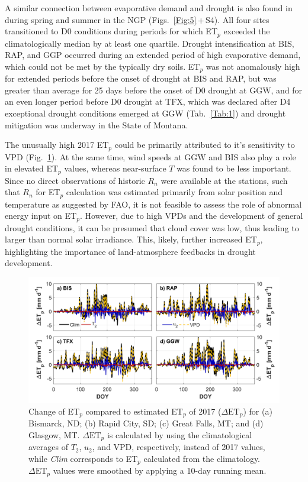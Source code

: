 \documentclass[hess, manuscript]{copernicus}
\begin{document}
A similar connection between evaporative demand and drought is also found in during spring and summer in the NGP (Figs.~\ref{Fig:5}\,+\,S4). All four sites transitioned to D0 conditions during periods for which ET$_p$ exceeded the climatologically median by at least one quartile. Drought intensification at BIS, RAP, and GGP occurred during an extended period of high evaporative demand, which could not be met by the typically dry soils. ET$_p$ was not anomalously high for extended periods before the onset of drought at BIS and RAP, but was greater than average for 25 days before the onset of D0 drought at GGW, and for an even longer period before D0 drought at TFX, which was declared after D4 exceptional drought conditions emerged at GGW (Tab.~\ref{Tab:1}) and drought mitigation was underway in the State of Montana.

The unusually high 2017 ET$_p$ could be primarily attributed to it's sensitivity to VPD (Fig.~\ref{Fig:6}). At the same time, wind speeds at GGW and BIS also play a role in elevated ET$_p$ values, whereas near-surface $T$ was found to be less important. Since no direct observations of historic $R_n$ were available at the stations, such that $R_n$ for ET$_p$ calculation was estimated primarily from solar position and temperature as suggested by FAO, it is not feasible to assess the role of abnormal energy input on ET$_p$. However, due to high VPDs and the development of general drought conditions, it can be presumed that cloud cover was low, thus leading to larger than normal solar irradiance. This, likely, further increased ET$_p$, highlighting the importance of land-atmosphere feedbacks in drought development.    

%
\begin{figure}[t]
\includegraphics[width=12cm]{./Figures/Climatology_ETpClim.png}
\caption{Change of ET$_p$ compared to estimated ET$_p$ of 2017  ($\Delta \mathrm{ET}_p$) for (a) Bismarck, ND; (b) Rapid City, SD; (c) Great Falls, MT; and (d) Glasgow, MT. $\Delta \mathrm{ET}_p$ is calculated by using the climatological averages of $T_2$, $u_2$, and VPD, respectively, instead of 2017 values, while \emph{Clim} corresponds to ET$_p$ calculated from the climatology. $\Delta \mathrm{ET}_p$  values were smoothed by applying a 10-day running mean.
}\label{Fig:6}
\end{figure}
\end{document}
